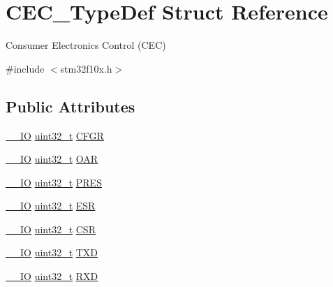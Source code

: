 \hypertarget{struct_c_e_c___type_def}{}\section{C\+E\+C\+\_\+\+Type\+Def Struct Reference}
\label{struct_c_e_c___type_def}


Consumer Electronics Control (C\+EC)  




{\ttfamily \#include $<$stm32f10x.\+h$>$}

\subsection*{Public Attributes}
\begin{DoxyCompactItemize}
\item 
\hyperlink{group___c_m_s_i_s___c_m3__core__definitions_gaec43007d9998a0a0e01faede4133d6be}{\+\_\+\+\_\+\+IO} \hyperlink{_p_e___types_8h_a33594304e786b158f3fb30289278f5af}{uint32\+\_\+t} \hyperlink{struct_c_e_c___type_def_a91a55cd277c20e5c5ad228fd9013d014}{C\+F\+GR}
\item 
\hyperlink{group___c_m_s_i_s___c_m3__core__definitions_gaec43007d9998a0a0e01faede4133d6be}{\+\_\+\+\_\+\+IO} \hyperlink{_p_e___types_8h_a33594304e786b158f3fb30289278f5af}{uint32\+\_\+t} \hyperlink{struct_c_e_c___type_def_aa578935e8a0795a0a7494f4d281bc43d}{O\+AR}
\item 
\hyperlink{group___c_m_s_i_s___c_m3__core__definitions_gaec43007d9998a0a0e01faede4133d6be}{\+\_\+\+\_\+\+IO} \hyperlink{_p_e___types_8h_a33594304e786b158f3fb30289278f5af}{uint32\+\_\+t} \hyperlink{struct_c_e_c___type_def_a2e1d5865f3d49a195e58f265b425256e}{P\+R\+ES}
\item 
\hyperlink{group___c_m_s_i_s___c_m3__core__definitions_gaec43007d9998a0a0e01faede4133d6be}{\+\_\+\+\_\+\+IO} \hyperlink{_p_e___types_8h_a33594304e786b158f3fb30289278f5af}{uint32\+\_\+t} \hyperlink{struct_c_e_c___type_def_a90adcbf5ee626747170b2f208770628f}{E\+SR}
\item 
\hyperlink{group___c_m_s_i_s___c_m3__core__definitions_gaec43007d9998a0a0e01faede4133d6be}{\+\_\+\+\_\+\+IO} \hyperlink{_p_e___types_8h_a33594304e786b158f3fb30289278f5af}{uint32\+\_\+t} \hyperlink{struct_c_e_c___type_def_ad9aa13645f701c5457fbf51a9ecf7aa4}{C\+SR}
\item 
\hyperlink{group___c_m_s_i_s___c_m3__core__definitions_gaec43007d9998a0a0e01faede4133d6be}{\+\_\+\+\_\+\+IO} \hyperlink{_p_e___types_8h_a33594304e786b158f3fb30289278f5af}{uint32\+\_\+t} \hyperlink{struct_c_e_c___type_def_a462a952588fc45732d4545dbe79356da}{T\+XD}
\item 
\hyperlink{group___c_m_s_i_s___c_m3__core__definitions_gaec43007d9998a0a0e01faede4133d6be}{\+\_\+\+\_\+\+IO} \hyperlink{_p_e___types_8h_a33594304e786b158f3fb30289278f5af}{uint32\+\_\+t} \hyperlink{struct_c_e_c___type_def_a13d5b0e5228d5cca9f7c5d8533705d21}{R\+XD}
\end{DoxyCompactItemize}


